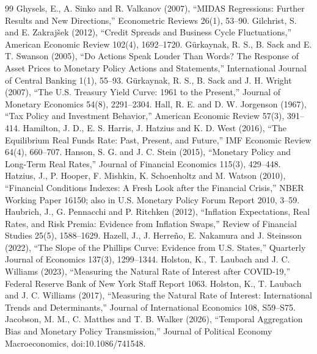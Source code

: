 \documentclass[11pt]{article}
\begin{document}
\begin{thebibliography}{99}
 Ghysels, E., A. Sinko and R. Valkanov (2007), ``MIDAS Regressions: Further Results and New Directions,'' Econometric Reviews 26(1), 53--90.
 Gilchrist, S. and E. Zakraj\v{s}ek (2012), ``Credit Spreads and Business Cycle Fluctuations,'' American Economic Review 102(4), 1692--1720.
 G\"urkaynak, R. S., B. Sack and E. T. Swanson (2005), ``Do Actions Speak Louder Than Words? The Response of Asset Prices to Monetary Policy Actions and Statements,'' International Journal of Central Banking 1(1), 55--93.
 G\"urkaynak, R. S., B. Sack and J. H. Wright (2007), ``The U.S. Treasury Yield Curve: 1961 to the Present,'' Journal of Monetary Economics 54(8), 2291--2304.
 Hall, R. E. and D. W. Jorgenson (1967), ``Tax Policy and Investment Behavior,'' American Economic Review 57(3), 391--414.
 Hamilton, J. D., E. S. Harris, J. Hatzius and K. D. West (2016), ``The Equilibrium Real Funds Rate: Past, Present, and Future,'' IMF Economic Review 64(4), 660--707.
 Hanson, S. G. and J. C. Stein (2015), ``Monetary Policy and Long-Term Real Rates,'' Journal of Financial Economics 115(3), 429--448.
 Hatzius, J., P. Hooper, F. Mishkin, K. Schoenholtz and M. Watson (2010), ``Financial Conditions Indexes: A Fresh Look after the Financial Crisis,'' NBER Working Paper 16150; also in U.S. Monetary Policy Forum Report 2010, 3--59.
 Haubrich, J., G. Pennacchi and P. Ritchken (2012), ``Inflation Expectations, Real Rates, and Risk Premia: Evidence from Inflation Swaps,'' Review of Financial Studies 25(5), 1588--1629.
 Hazell, J., J. Herre\~no, E. Nakamura and J. Steinsson (2022), ``The Slope of the Phillips Curve: Evidence from U.S. States,'' Quarterly Journal of Economics 137(3), 1299--1344.
 Holston, K., T. Laubach and J. C. Williams (2023), ``Measuring the Natural Rate of Interest after COVID-19,'' Federal Reserve Bank of New York Staff Report 1063.
 Holston, K., T. Laubach and J. C. Williams (2017), ``Measuring the Natural Rate of Interest: International Trends and Determinants,'' Journal of International Economics 108, S59--S75.
 Jacobson, M. M., C. Matthes and T. B. Walker (2026), ``Temporal Aggregation Bias and Monetary Policy Transmission,'' Journal of Political Economy Macroeconomics, doi:10.1086/741548.

\end{thebibliography}
\end{document}
